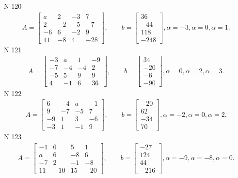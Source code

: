 \documentclass[11pt]{report}
\begin{document}
N 120
\begin{align*}
 A = \left[\begin{matrix}a & 2 & -3 & 7\\2 & -2 & -5 & -7\\-6 & 6 & -2 & 9\\11 & -8 & 4 & -28\end{matrix}\right],
    \qquad b = \left[\begin{matrix}36\\-44\\118\\-248\end{matrix}\right], \alpha = -3, \alpha = 0, \alpha = 1. 
 \end{align*}
N 121
\begin{align*}
 A = \left[\begin{matrix}-3 & a & 1 & -9\\-7 & -4 & -4 & 2\\-5 & 5 & 9 & 9\\4 & -1 & 6 & 36\end{matrix}\right],
    \qquad b = \left[\begin{matrix}34\\-20\\-6\\-90\end{matrix}\right], \alpha = 0, \alpha = 2, \alpha = 3. 
 \end{align*}
N 122
\begin{align*}
 A = \left[\begin{matrix}6 & -4 & a & -1\\9 & -7 & -5 & 7\\-9 & 1 & 3 & -6\\-3 & 1 & -1 & 9\end{matrix}\right],
    \qquad b = \left[\begin{matrix}-20\\62\\-34\\70\end{matrix}\right], \alpha = -2, \alpha = 0, \alpha = 2. 
 \end{align*}
N 123
\begin{align*}
 A = \left[\begin{matrix}-1 & 6 & 5 & 1\\a & 6 & -8 & 6\\-7 & 2 & -1 & -8\\11 & -10 & 15 & -20\end{matrix}\right],
    \qquad b = \left[\begin{matrix}-27\\124\\44\\-216\end{matrix}\right], \alpha = -9, \alpha = -8, \alpha = 0. 
 \end{align*}
\end{document}
